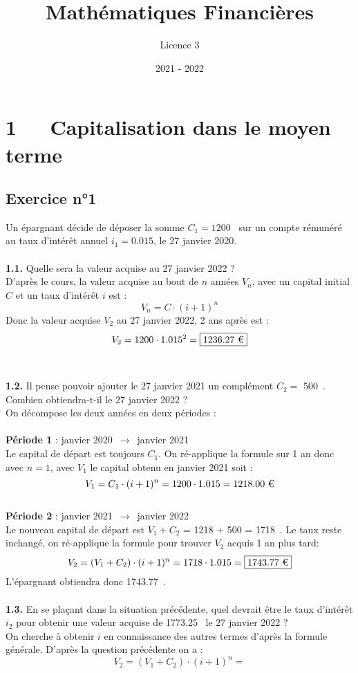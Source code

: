 \documentclass{article}
\title{Mathématiques Financières}
\author{Licence 3}
\date{2021 - 2022}
\begin{document}
\normalsize
\maketitle

\renewcommand*\contentsname{Table des matières}
\newpage

\section{1   Capitalisation dans le moyen terme}
\subsection{Exercice n°1}
\textcolor{exogris}{
Un épargnant décide de déposer la somme $C_1 = 1200$ \texteuro sur un compte rémunéré au taux d’intérêt annuel $i_1 = 0.015$, le 27 janvier 2020.
}
\\\\ \textcolor{exogris}{\textbf{1.1.}
Quelle sera la valeur acquise au 27 janvier 2022 ?
}
\\%
D'après le cours, la valeur acquise au bout de $n$ années $V_n$, avec un capital initial $C$ et un taux d'intérêt $i$ est :
$$V_n = C\cdot(i+1)^n$$
Donc la valeur acquise $V_2$ au 27 janvier 2022, 2 ans après est :
$$V_2 = 1200 \cdot 1.015^2 = \boxed{1236.27 \text{ \texteuro}}$$
\\%
\\%
\textcolor{exogris}{\textbf{1.2.}
Il pense pouvoir ajouter le 27 janvier 2021 un complément $C_2 =$ 500 \texteuro. Combien obtiendra-t-il le 27 janvier 2022 ?
}
\\%
On décompose les deux années en deux périodes :
\\\\\textbf{Période 1} : janvier 2020 $\rightarrow$ janvier 2021
\\Le capital de départ est toujours $C_1$. On ré-applique la formule sur 1 an donc avec $n=1$, avec $V_1$ le capital obtenu en janvier 2021 soit :
$$V_1 = C_1 \cdot (i+1)^n = 1200 \cdot 1.015 = 1218.00 \text{ \texteuro}$$
\\\textbf{Période 2} : janvier 2021 $\rightarrow$ janvier 2022
\\Le nouveau capital de départ est $V_1 + C_2$ = 1218 + 500 = 1718 \texteuro.
Le taux reste inchangé, on ré-applique la formule pour trouver $V_2$ acquis 1 an plus tard:
$$V_2 = (V_1 + C_2) \cdot (i+1)^n = 1718 \cdot 1.015 = \boxed{1743.77 \text{ \texteuro}}$$
L'épargnant obtiendra donc 1743.77 \texteuro.
\\%
\\%
\textcolor{exogris}{\textbf{1.3.}
En se plaçant dans la situation précédente, quel devrait être le taux d’intérêt $i_2$ pour obtenir une valeur
acquise de 1773.25 \texteuro le 27 janvier 2022 ?
}%
\\%
On cherche à obtenir $i$ en connaissance des autres termes d'après la formule générale.
D'après la question précédente on a :
$$V_2 = (V_1 + C_2)\cdot (i+1)^n = $$
\end{document}
